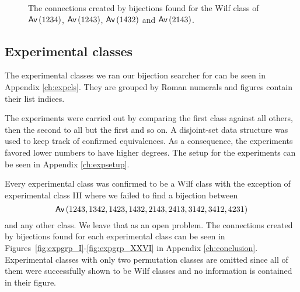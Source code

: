 \begin{figure}[ht!]
    \centering
    
    \caption{The connections created by bijections found for the Wilf class of $\textsf{Av}\left(1234\right)$, $\textsf{Av}\left(1243\right)$, $\textsf{Av}\left(1432\right)$ and $\textsf{Av}\left(2143\right)$.}
    \label{fig:1x4bi}
\end{figure}

\subsection{Experimental classes}
The experimental classes we ran our bijection searcher for can be seen in Appendix \ref{ch:expcls}. They are grouped by Roman numerals and figures contain their list indices.

The experiments were carried out by comparing the first class against all others, then the second to all but the first and so on. A disjoint-set data structure was used to keep track of confirmed equivalences. As a consequence, the experiments favored lower numbers to have higher degrees. The setup for the experiments can be seen in Appendix \ref{ch:expsetup}.

Every experimental class was confirmed to be a Wilf class with the exception of experimental class III where we failed to find a bijection between
\[
    \textsf{Av}\left(1243,1342,1423,1432,2143,2413,3142,3412,4231\right)
\]
and any other class. We leave that as an open problem. The connections created by bijections found for each experimental class can be seen in Figures~\ref{fig:expgrp_I}-\ref{fig:expgrp_XXVI} in Appendix \ref{ch:conclusion}. Experimental classes with only two permutation classes are omitted since all of them were successfully shown to be Wilf classes and no information is contained in their figure.